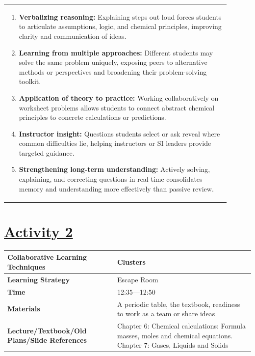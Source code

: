 \documentclass{article}
\begin{document}
{{\begin{tabular}{|p{0.9\linewidth}|}
\begin{enumerate}
    \item \textbf{Verbalizing reasoning:} Explaining steps out loud forces students to articulate assumptions, logic, and chemical principles, improving clarity and communication of ideas.
    \item \textbf{Learning from multiple approaches:} Different students may solve the same problem uniquely, exposing peers to alternative methods or perspectives and broadening their problem-solving toolkit.
    \item \textbf{Application of theory to practice:} Working collaboratively on worksheet problems allows students to connect abstract chemical principles to concrete calculations or predictions.
    \item \textbf{Instructor insight:} Questions students select or ask reveal where common difficulties lie, helping instructors or SI leaders provide targeted guidance.
    \item \textbf{Strengthening long-term understanding:} Actively solving, explaining, and correcting questions in real time consolidates memory and understanding more effectively than passive review.
\end{enumerate}
\hline
\end{tabular}

\newpage
\noindent
\newpage
\noindent
\section*{\underline{Activity 2}}
\begin{tabular}{|p{4.2cm}|p{9.8cm}|}
\hline
\textbf{Collaborative Learning Techniques} & Clusters \\
\hline
\textbf{Learning Strategy} & Escape Room \\
\hline
\textbf{Time} & 12:35---12:50 \\
\hline
\textbf{Materials} & A periodic table, the textbook, readiness to work as a team or share ideas \\
\hline
\textbf{Lecture/Textbook/Old Plans/Slide References} & Chapter 6: Chemical calculations: Formula masses, moles and chemical equations. Chapter 7: Gases, Liquids and Solids \\
\hline
\end{tabular}

}}
\end{document}
